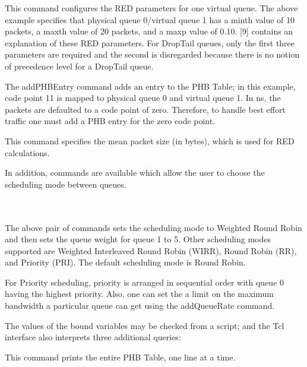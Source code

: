 
This command configures the RED parameters for one virtual queue.  The above example specifies that physical queue 0/virtual queue 1 has a minth value of 10 packets, a maxth value of 20 packets, and a maxp value of 0.10.  [9] contains an explanation of these RED parameters. For DropTail queues, only the first three parameters are required and the second is disregarded because there is no notion of precedence level for a DropTail queue.


The addPHBEntry command adds an entry to the PHB Table; in this example, code point 11 is mapped to physical queue 0 and virtual queue 1. In ns, the packets are defaulted to a code point of zero. Therefore, to handle best effort traffic one must add a PHB entry for the zero code point.


This command specifies the mean packet size (in bytes), which is used for RED calculations.

In addition, commands are available which allow the user to choose the scheduling mode between queues.

\\
\\

The above pair of commands sets the scheduling mode to Weighted Round Robin and then sets the queue weight for queue 1 to 5. Other scheduling modes supported are Weighted Interleaved Round Robin (WIRR), Round Robin (RR), and Priority (PRI). The default scheduling mode is Round Robin.

For Priority scheduling, priority is arranged in sequential order with queue 0 having the highest priority. Also, one can set the a limit on the maximum bandwidth a particular queue can get using the addQueueRate command.



The values of the bound variables may be checked from a script; and the 
 Tcl interface also interprets three additional queries:


This command prints the entire PHB Table, one line at a time.


